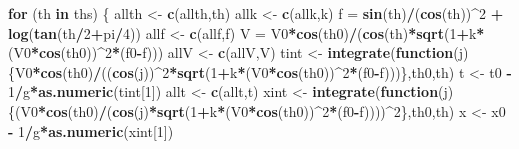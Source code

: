 \documentclass[
]{article}
\newenvironment{Shaded}{\begin{snugshade}}{\end{snugshade}}
\newcommand{\ControlFlowTok}[1]{\textcolor[rgb]{0.13,0.29,0.53}{\textbf{#1}}}
\newcommand{\DecValTok}[1]{\textcolor[rgb]{0.00,0.00,0.81}{#1}}
\newcommand{\KeywordTok}[1]{\textcolor[rgb]{0.13,0.29,0.53}{\textbf{#1}}}
\newcommand{\NormalTok}[1]{#1}
\newcommand{\OperatorTok}[1]{\textcolor[rgb]{0.81,0.36,0.00}{\textbf{#1}}}
\newcommand{\StringTok}[1]{\textcolor[rgb]{0.31,0.60,0.02}{#1}}
\begin{document}
\begin{Shaded}
\begin{Highlighting}[]
\ControlFlowTok{for}\NormalTok{ (th }\ControlFlowTok{in}\NormalTok{ ths) \{}
\NormalTok{  allth <-}\StringTok{ }\KeywordTok{c}\NormalTok{(allth,th)}
\NormalTok{  allk <-}\StringTok{ }\KeywordTok{c}\NormalTok{(allk,k)}
\NormalTok{  f =}\StringTok{ }\KeywordTok{sin}\NormalTok{(th)}\OperatorTok{/}\NormalTok{(}\KeywordTok{cos}\NormalTok{(th))}\OperatorTok{^}\DecValTok{2} \OperatorTok{+}\StringTok{ }\KeywordTok{log}\NormalTok{(}\KeywordTok{tan}\NormalTok{(th}\OperatorTok{/}\DecValTok{2}\OperatorTok{+}\NormalTok{pi}\OperatorTok{/}\DecValTok{4}\NormalTok{))}
\NormalTok{  allf <-}\StringTok{ }\KeywordTok{c}\NormalTok{(allf,f)}
\NormalTok{  V =}\StringTok{ }\NormalTok{V0}\OperatorTok{*}\KeywordTok{cos}\NormalTok{(th0)}\OperatorTok{/}\NormalTok{(}\KeywordTok{cos}\NormalTok{(th)}\OperatorTok{*}\KeywordTok{sqrt}\NormalTok{(}\DecValTok{1}\OperatorTok{+}\NormalTok{k}\OperatorTok{*}\NormalTok{(V0}\OperatorTok{*}\KeywordTok{cos}\NormalTok{(th0))}\OperatorTok{^}\DecValTok{2}\OperatorTok{*}\NormalTok{(f0}\OperatorTok{-}\NormalTok{f)))}
\NormalTok{  allV <-}\StringTok{ }\KeywordTok{c}\NormalTok{(allV,V)}
\NormalTok{  tint <-}\StringTok{ }\KeywordTok{integrate}\NormalTok{(}\ControlFlowTok{function}\NormalTok{(j) \{V0}\OperatorTok{*}\KeywordTok{cos}\NormalTok{(th0)}\OperatorTok{/}\NormalTok{((}\KeywordTok{cos}\NormalTok{(j))}\OperatorTok{^}\DecValTok{2}\OperatorTok{*}\KeywordTok{sqrt}\NormalTok{(}\DecValTok{1}\OperatorTok{+}\NormalTok{k}\OperatorTok{*}\NormalTok{(V0}\OperatorTok{*}\KeywordTok{cos}\NormalTok{(th0))}\OperatorTok{^}\DecValTok{2}\OperatorTok{*}\NormalTok{(f0}\OperatorTok{-}\NormalTok{f)))\},th0,th)}
\NormalTok{  t <-}\StringTok{ }\NormalTok{t0 }\OperatorTok{-}\StringTok{ }\DecValTok{1}\OperatorTok{/}\NormalTok{g}\OperatorTok{*}\KeywordTok{as.numeric}\NormalTok{(tint[}\DecValTok{1}\NormalTok{])}
\NormalTok{  allt <-}\StringTok{ }\KeywordTok{c}\NormalTok{(allt,t)}
\NormalTok{  xint <-}\StringTok{ }\KeywordTok{integrate}\NormalTok{(}\ControlFlowTok{function}\NormalTok{(j) \{(V0}\OperatorTok{*}\KeywordTok{cos}\NormalTok{(th0)}\OperatorTok{/}\NormalTok{(}\KeywordTok{cos}\NormalTok{(j)}\OperatorTok{*}\KeywordTok{sqrt}\NormalTok{(}\DecValTok{1}\OperatorTok{+}\NormalTok{k}\OperatorTok{*}\NormalTok{(V0}\OperatorTok{*}\KeywordTok{cos}\NormalTok{(th0))}\OperatorTok{^}\DecValTok{2}\OperatorTok{*}\NormalTok{(f0}\OperatorTok{-}\NormalTok{f))))}\OperatorTok{^}\DecValTok{2}\NormalTok{\},th0,th)}
\NormalTok{  x <-}\StringTok{ }\NormalTok{x0 }\OperatorTok{-}\StringTok{ }\DecValTok{1}\OperatorTok{/}\NormalTok{g}\OperatorTok{*}\KeywordTok{as.numeric}\NormalTok{(xint[}\DecValTok{1}\NormalTok{])}

\end{Highlighting}
\end{Shaded}
\end{document}
